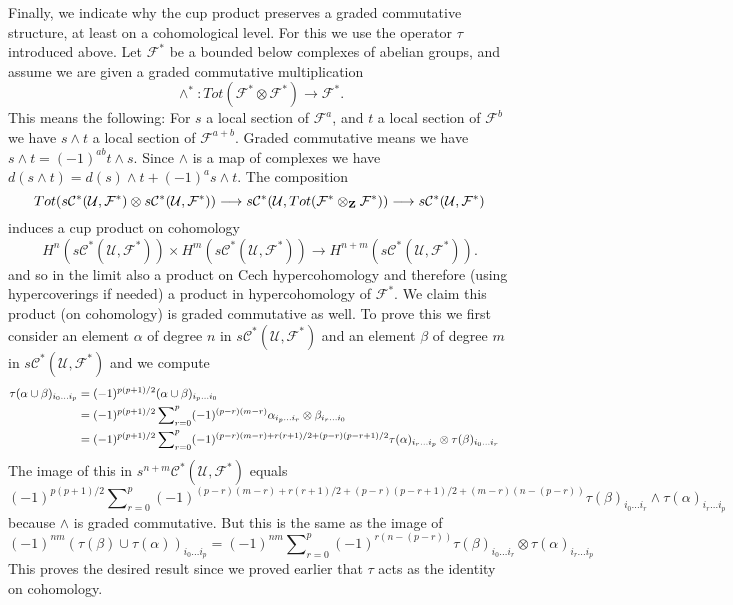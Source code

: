 \medskip\noindent
Finally, we indicate why the cup product preserves
a graded commutative structure, at least on a cohomological level.
For this we use the operator
$\tau$ introduced above. Let ${\mathcal F}^*$ be a bounded below
complexes of abelian groups, and assume we are given
a graded commutative multiplication
$$
\wedge^* : Tot({\mathcal F}^*\otimes {\mathcal F}^*) \to {\mathcal F}^*.
$$
This means the following: For $s$ a local section of
${\mathcal F}^a$, and $t$ a local section of ${\mathcal F}^b$
we have $s \wedge t$ a local section of ${\mathcal F}^{a + b}$.
Graded commutative means we have
$s \wedge t = (-1)^{ab} t \wedge s$. Since $\wedge$ is a map
of complexes we have
$d(s\wedge t) = d(s) \wedge t + (-1)^a s \wedge t$.
The composition
$$
Tot(
s{\mathcal C}^*({\mathcal U}, {\mathcal F}^*)
\otimes
s{\mathcal C}^*({\mathcal U}, {\mathcal F}^*)
) \longrightarrow
s{\mathcal C}^*({\mathcal U}, Tot({\mathcal F}^*\otimes_{\bf Z}{\mathcal F}^*))
\longrightarrow
s{\mathcal C}^*({\mathcal U}, {\mathcal F}^*)
$$
induces a cup product on cohomology
$$
H^n(s{\mathcal C}^*({\mathcal U}, {\mathcal F}^*))
\times
H^m(s{\mathcal C}^*({\mathcal U}, {\mathcal F}^*))
\longrightarrow
H^{n + m}(s{\mathcal C}^*({\mathcal U}, {\mathcal F}^*)).
$$
and so in the limit also a product on Cech hypercohomology
and therefore (using hypercoverings if needed) a product
in hypercohomology of ${\mathcal F}^*$. We claim this product
(on cohomology) is graded commutative as well. To prove this
we first consider an element $\alpha$ of degree $n$ in
$s{\mathcal C}^*({\mathcal U}, {\mathcal F}^*)$ and an element
$\beta$ of degree $m$ in $s{\mathcal C}^*({\mathcal U}, {\mathcal F}^*)$
and we compute
\begin{align*}
\tau( \alpha \cup \beta )_{i_0\ldots i_p}
& =
(-1)^{p(p + 1)/2}
(\alpha \cup \beta)_{i_p\ldots i_0}
\cr
& =
(-1)^{p(p + 1)/2}
\sum\nolimits_{r = 0}^p
(-1)^{(p-r)(m-r)}
\alpha_{i_p\ldots i_r}\otimes \beta_{i_r\ldots i_0}
\cr
& =
(-1)^{p(p + 1)/2}
\sum\nolimits_{r = 0}^p
(-1)^{(p-r)(m-r) + r(r + 1)/2 + (p-r)(p-r + 1)/2}
\tau(\alpha)_{i_r\ldots i_p}\otimes \tau(\beta)_{i_0\ldots i_r}
\end{align*}
The image of this in $s^{n + m}{\mathcal C}^*({\mathcal U}, {\mathcal F}^*)$
equals
$$
(-1)^{p(p + 1)/2}
\sum\nolimits_{r = 0}^p
(-1)^{(p-r)(m-r) + r(r + 1)/2 + (p-r)(p-r + 1)/2 + (m-r)(n-(p-r))}
\tau(\beta)_{i_0\ldots i_r} \wedge \tau(\alpha)_{i_r\ldots i_p}
$$
because $\wedge$ is graded commutative. But this is the same
as the image of
$$
(-1)^{nm}
(\tau(\beta) \cup \tau(\alpha))_{i_0\ldots i_p}
=
(-1)^{nm}
\sum\nolimits_{r = 0}^p
(-1)^{r(n-(p-r))}
\tau(\beta)_{i_0\ldots i_r} \otimes \tau(\alpha)_{i_r\ldots i_p}
$$
This proves the desired result since we proved earlier that
$\tau$ acts as the identity on cohomology.


